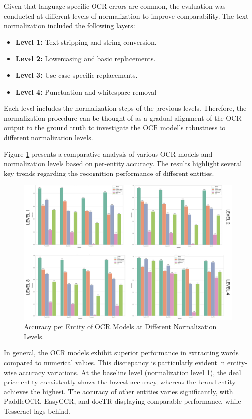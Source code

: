 \documentclass[11pt]{article}
\begin{document}
Given that language-specific OCR errors are common, the evaluation was conducted at different levels of normalization to improve comparability. The text normalization included the following layers:
\begin{itemize}
    \item \textbf{Level 1:} Text stripping and string conversion.
    \item \textbf{Level 2:} Lowercasing and basic replacements.
    \item \textbf{Level 3:} Use-case specific replacements.
    \item \textbf{Level 4:} Punctuation and whitespace removal.
\end{itemize}
Each level includes the normalization steps of the previous levels. Therefore, the normalization procedure can be thought of as a gradual alignment of the OCR output to the ground truth to investigate the OCR model's robustness to different normalization levels.


 Figure \ref{fig:eval_ocr_accuracies} presents a comparative analysis of various OCR models and normalization levels based on per-entity accuracy. The results highlight several key trends regarding the recognition performance of different entities.

\begin{figure}[h!]
    \centering
    \includegraphics[width=0.8\linewidth]{figures/eval_ocr_accuracies.png}
    \caption{Accuracy per Entity of OCR Models at Different Normalization Levels.}
    \label{fig:eval_ocr_accuracies}
\end{figure}

In general, the OCR models exhibit superior performance in extracting words compared to numerical values. This discrepancy is particularly evident in entity-wise accuracy variations. At the baseline level (normalization level 1), the deal price entity consistently shows the lowest accuracy, whereas the brand entity achieves the highest. The accuracy of other entities varies significantly, with PaddleOCR, EasyOCR, and docTR displaying comparable performance, while Tesseract lags behind.
\end{document}
